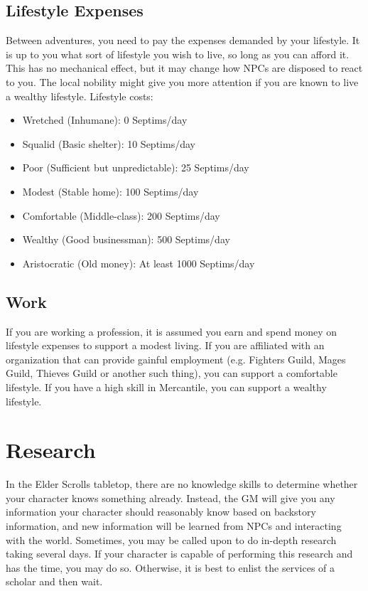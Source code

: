 \documentclass[12pt]{book}
\begin{document}
\subsection{Lifestyle Expenses}
Between adventures, you need to pay the expenses demanded by your lifestyle. It is up to you what sort of lifestyle you wish to live, so long as you can afford it. This has no mechanical effect, but it may change how NPCs are disposed to react to you. The local nobility might give you more attention if you are known to live a wealthy lifestyle. Lifestyle costs:

\begin{itemize}
	\item Wretched (Inhumane): 0 Septims/day
	\item Squalid (Basic shelter): 10 Septims/day
	\item Poor (Sufficient but unpredictable): 25 Septims/day
	\item Modest (Stable home): 100 Septims/day
	\item Comfortable (Middle-class): 200 Septims/day
	\item Wealthy (Good businessman): 500 Septims/day
	\item Aristocratic (Old money): At least 1000 Septims/day
\end{itemize}

\subsection{Work}
If you are working a profession, it is assumed you earn and spend money on lifestyle expenses to support a modest living. If you are affiliated with an organization that can provide gainful employment (e.g. Fighters Guild, Mages Guild, Thieves Guild or another such thing), you can support a comfortable lifestyle. If you have a high skill in Mercantile, you can support a wealthy lifestyle.

\section{Research}
In the Elder Scrolls tabletop, there are no knowledge skills to determine whether your character knows something already. Instead, the GM will give you any information your character should reasonably know based on backstory information, and new information will be learned from NPCs and interacting with the world. Sometimes, you may be called upon to do in-depth research taking several days. If your character is capable of performing this research and has the time, you may do so. Otherwise, it is best to enlist the services of a scholar and then wait.
\end{document}

